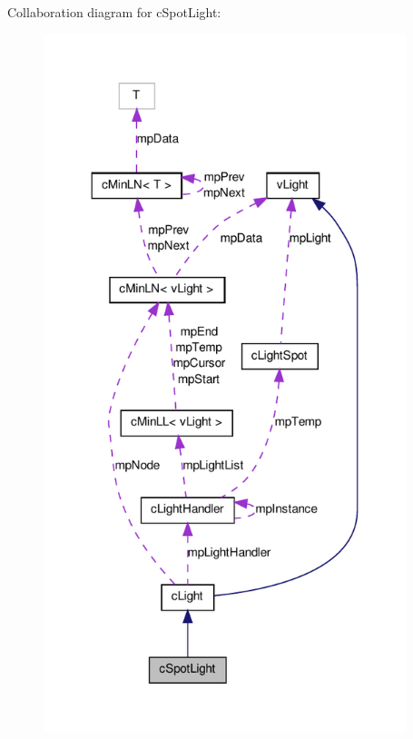 Collaboration diagram for cSpotLight:
\nopagebreak
\begin{figure}[H]
\begin{center}
\leavevmode
\includegraphics[width=299pt]{classc_spot_light__coll__graph}
\end{center}
\end{figure}
